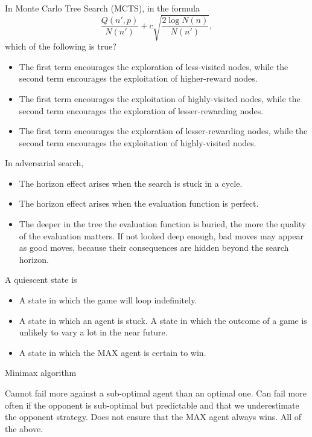 \documentclass[11pt, a4paper]{article}
\begin{document}
In Monte Carlo Tree Search (MCTS), in the formula
    \begin{equation*}
        \frac{Q(n', p)}{N(n')} + c \sqrt{\frac{2 \log N(n)}{N(n')}},
    \end{equation*}
which of the following is true?
\begin{itemize}
    \solitem The first term encourages the exploitation of higher-reward nodes, while the second encourages the exploration of
    less-visited nodes.
    \item The first term encourages the exploration of less-visited nodes, while the second term encourages the exploitation
    of higher-reward nodes.
    \item The first term encourages the exploitation of highly-visited nodes, while the second term encourages the exploration
    of lesser-rewarding nodes.
    \item The first term encourages the exploration of lesser-rewarding nodes, while the second term encourages the exploitation of highly-visited nodes.
\end{itemize}

In adversarial search,
\begin{itemize}
    \item The horizon effect arises when the search is stuck in a cycle.
    \item The horizon effect arises when the evaluation function is perfect.
    \item The deeper in the tree the evaluation function is buried, the more the quality of the evaluation matters.
    \solitem If not looked deep enough, bad moves may appear as good moves, because their consequences are hidden beyond
    the search horizon.
\end{itemize}

A quiescent state is 
\begin{itemize}
    \item A state in which the game will loop indefinitely.
    \item A state in which an agent is stuck.
    \solitem A state in which the outcome of a game is unlikely to vary a lot in the near future.
    \item A state in which the MAX agent is certain to win.
\end{itemize}

Minimax algorithm
\begin{itemize}
    \solitem Cannot fail more against a sub-optimal agent than an optimal one.
    \solitem Can fail more often if the opponent is sub-optimal but predictable and that we underestimate the opponent strategy.
    \solitem Does not ensure that the MAX agent always wins.
    \solitem All of the above.
\end{itemize}
\end{document}
